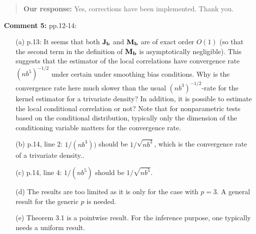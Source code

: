 \documentclass[
  12pt,
  letterpaper]{article}
\numberwithin{equation}{section}
\begin{document}
\begin{quote}
\textbf{Our response:} Yes, corrections have been implemented. Thank you.
\end{quote}

\textbf{Comment 5:} pp.12-14:

\begin{itemize}

\item[(a)] p.13: It seems that both ${\bf J}_{\bf b}$ and ${\bf M}_{\bf b}$ are of exact order $O(1)$ (so that the second term in the definition of ${\bf M}_{\bf b}$ is asymptotically negligible). This suggests that the estimator of the local correlations have convergence rate $(nb^5)^{-1/2}$ under certain under smoothing bias conditions. Why is the convergence rate here much slower than the usual $(nb^3)^{-1/2}$-rate for the kernel estimator for a trivariate density? In addition, it is possible to estimate the local conditional correlation or not? Note that for nonparametric tests based on the conditional distribution, typically only the dimension of the conditioning variable matters for the convergence rate.
 
\item[(b)] p.14, line 2: $1/(nb^3))$ should be $1/\sqrt{nb^3}$, which is the convergence rate of a trivariate density..

\item [(c)] p.14, line 4: $1/(nb^5)$ should be $1/\sqrt{nb^5}$.

\item [(d)] The results are too limited as it is only for the case with $p=3$. A general result for the generic $p$ is needed.

\item [(e)] Theorem 3.1 is a pointwise result. For the inference purpose, one typically needs a uniform result.

\end{itemize}
\end{document}
